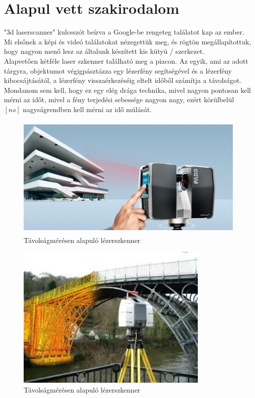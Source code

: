 \documentclass[12pt,a4paper]{article}
\begin{document}
\section{Alapul vett szakirodalom} %

	"3d laserscanner" kulcsszót beírva a Google-be rengeteg találatot kap az ember. Mi elsőnek a képi és videó találatokat nézegettük meg, és rögtön megállapítottuk, hogy nagyon menő lesz az általunk készített kis kütyü / szerkezet.\\
	
	Alapvetően kétféle laser szkenner található meg a piacon. Az egyik, ami az adott tárgyra, objektumot végigpásztázza egy lézerfény segítségével és a lézerfény kibocsájtásától, a lézerfény visszaérkezéséig eltelt időből számítja a távolságot. Mondanom sem kell, hogy ez egy elég drága technika, mivel nagyon pontosan kell mérni az időt, mivel a fény terjedési sebessége nagyon nagy, ezért körülbelül $[ns]$ nagyságrendben kell mérni az idő múlását.
	\\
	\begin{figure}[h!]
		\begin{center}
			\includegraphics[height=6cm]{images/Faro_Building_Scan.jpg}
		\end{center}
		\caption{Távolságmérésen alapuló lézerszkenner\cite{FaroBuildingScan}}
	\end{figure}

	\begin{figure}[h!]
		\begin{center}
			\includegraphics[height=7cm]{images/Bridge_Scan.jpg}
		\end{center}
		\caption{Távolságmérésen alapuló lézerszkenner\cite{BridgeScan}}
	\end{figure}	
\end{document}
